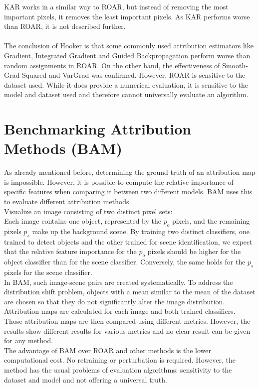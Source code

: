 KAR works in a similar way to ROAR, but instead of removing the most important pixels, it removes the least important pixels. As KAR performs worse than ROAR, it is not described further.\\
\\
The conclusion of Hooker \cite{hooker2019benchmark} is that some commonly used attribution estimators like Gradient\cite{simonyan2014deep}, Integrated Gradient\cite{sundararajan2017axiomatic} and Guided Backpropagation\cite{springenberg2015striving} perform worse than random assignments in ROAR. On the other hand, the effectiveness of Smooth-Grad-Squared and VarGrad was confirmed. However, ROAR is sensitive to the dataset used. While it does provide a numerical evaluation, it is sensitive to the model and dataset used and therefore cannot universally evaluate an algorithm.

\section{Benchmarking Attribution Methods (BAM)}
\label{sec:bam}

As already mentioned before, determining the ground truth of an attribution map is impossible. However, it is possible to compute the relative importance of specific features when comparing it between two different models\cite{yang2019benchmarking}. BAM\cite{yang2019benchmarking} uses this to evaluate different attribution methods.
\\
Visualize an image consisting of two distinct pixel sets:\\ 
Each image contains one object, represented by the $p_o$ pixels, and the remaining pixels $p_s$ make up the background scene. By training two distinct classifiers, one trained to detect objects and the other trained for scene identification, we expect that the relative feature importance for the $p_o$ pixels should be higher for the object classifier than for the scene classifier. Conversely, the same holds for the $p_s$ pixels for the scene classifier.\\
In BAM, such image-scene pairs are created systematically. To address the distribution shift problem, objects with a mean similar to the mean of the dataset are chosen so that they do not significantly alter the image distribution. Attribution maps are calculated for each image and both trained classifiers. Those attribution maps are then compared using different metrics. However, the results show different results for various metrics and no clear result can be given for any method.\\
The advantage of BAM over ROAR \cite{hooker2019benchmark} and other methods is the lower computational cost. No retraining or perturbation is required. However, the method has the usual problems of evaluation algorithms: sensitivity to the dataset and model and not offering a universal truth.


